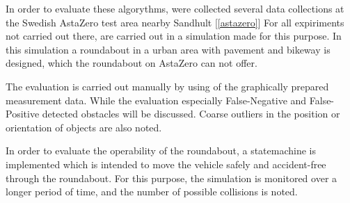 \documentclass[11pt,oneside,openright]{mpreport}
\begin{document}

In order to evaluate these algorythms, were collected several data collections at the Swedish AstaZero test area nearby Sandhult [\cref{astazero}]
For all expiriments not carried out there, are carried out in a simulation made for this purpose. In this simulation a roundabout in a urban area 
with pavement and bikeway is designed, which the roundabout on AstaZero can not offer.


The evaluation is carried out manually by using of the graphically prepared measurement data. 
While the evaluation especially False-Negative and False-Positive detected obstacles will be discussed.
Coarse outliers in the position or orientation of objects are also noted.


In order to evaluate the operability of the roundabout, a statemachine is implemented which is intended to move the vehicle safely and accident-free through the roundabout.
For this purpose, the simulation is monitored over a longer period of time, and the number of possible collisions is noted.
\end{document}
